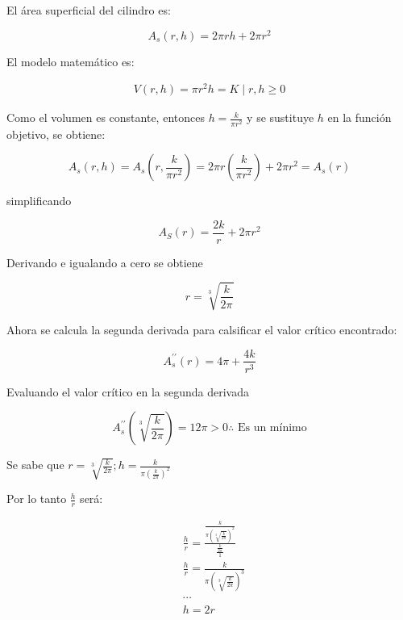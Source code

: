 El área superficial del cilindro es:

\begin{equation*}
	A_s(r,h)=2\pi rh+2\pi r^2
\end{equation*}

El modelo matemático es:

\begin{align*}
	V(r,h)=\pi r^2h=K \mid r,h\geq 0
\end{align*}

Como el volumen es constante, entonces $h=\frac{k}{\pi r^2}$ y se sustituye $h$ en la función objetivo, se obtiene:

\begin{equation*}
	A_s(r,h)=A_s\left(r,\frac{k}{\pi r^2}\right)=2\pi r\left(\frac{k}{\pi r^2}\right)+2\pi r^2=A_s(r)
\end{equation*}

simplificando

\begin{equation*}
	A_S(r)=\frac{2k}{r}+2\pi r^2
\end{equation*}

Derivando e igualando a cero se obtiene

\begin{equation*}
	r=\sqrt[3]{\frac{k}{2\pi}}
\end{equation*}

Ahora se calcula la segunda derivada para calsificar el valor crítico encontrado:

\begin{equation*}
	A_s^{\prime\prime}(r)=4\pi+\frac{4k}{r^3}
\end{equation*}

Evaluando el valor crítico en la segunda derivada

\begin{equation*}
	A_s^{\prime\prime}\left(\sqrt[3]{\frac{k}{2\pi}}\right)=12\pi>0\therefore \text{ Es un mínimo}
\end{equation*}

Se sabe que $r=\sqrt[3]{\frac{k}{2\pi}};h=\frac{k}{\pi\left(\frac{k}{2\pi} \right)^2}$

Por lo tanto $\frac{h}{r}$ será:

\begin{align*}
	 & \frac{h}{r}=\frac{\frac{k}{\pi\left(\sqrt[3]{\frac{k}{2\pi}}\right)^2}}{\frac{\frac{k}{2\pi}}{1}} \\
	 & \frac{h}{r}=\frac{k}{\pi\left(\sqrt[3]{\frac{k}{2\pi}}\right)^3}                                  \\
	 & \cdots                                                                                            \\
	 & h=2r
\end{align*}

